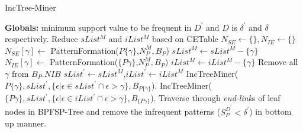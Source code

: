 \begin{algorithm}[!thb]
      \scriptsize %
      \caption{IncTree-Miner}
      \label{algorithm:inc_tree_miner}
       \begin{algorithmic}[1]
       \State \textbf{Globals: }minimum support value to be frequent in $D^{\prime}$ and $D$ is $\delta^{\prime}$ and $\delta$ respectively.
            \State Reduce $sList^{M}$ and $iList^{M}$ based on CETable
            \State  {}
            \State $N_{SE} \gets \{\},N_{IE} \gets \{\}$
            \State {}
                \State $N_{SE}[\gamma] \gets $ PatternFormation($P\{\gamma\}$,$N_{P}^{M},B_{P}$)
                \State {}
                 $sList^{M} \gets sList^{M}-\{\gamma\}$
                \EndIf
            \EndFor
            \State {}
                \State $N_{IE}[\gamma] \gets $ PatternFormation($\{P\gamma\}$,$N_{P}^{M},B_{P}$)
                \State {}
                  $iList^{M} \gets iList^{M}-\{\gamma\}$
                \EndIf
            \EndFor
            \State {}
                \State Remove all $\gamma$ from $B_{P}.NIB$
            \EndIf
            \State {}
            \State $sList^{\prime} \gets sList^{M}$,$iList^{\prime} \gets iList^{M}$ 
            \State {}
                \State IncTreeMiner($P\{\gamma\},sList^{\prime},\{ \epsilon \vert \epsilon \in sList^{\prime} \cap \epsilon>\gamma \},B_{P\{\gamma\}}$). 
            \EndFor
            \State {}
                \State IncTreeMiner($\{P\gamma\},sList^{\prime},\{ \epsilon \vert \epsilon \in iList^{\prime} \cap \epsilon>\gamma \},B_{\{P\gamma\}}$). 
            \EndFor
        \EndProcedure
            \State Traverse through \textit{end-link}s of leaf nodes in BPFSP-Tree and remove the infrequent patterns ($S_{P}^{D^{\prime}} < \delta^{\prime}$) in bottom up manner. 
        \EndProcedure
       \end{algorithmic}
\end{algorithm}

